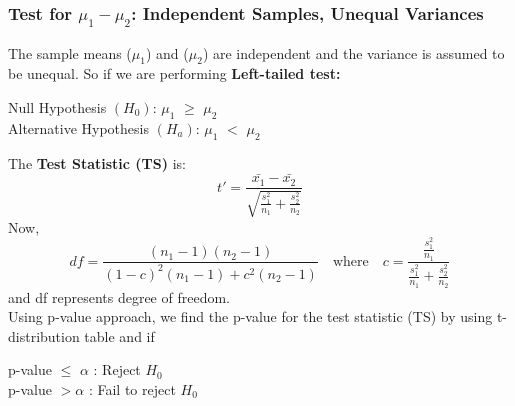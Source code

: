 \documentclass[12pt,a4paper]{report}
\begin{document}
\subsubsection*{\Large{Test for $\mu_1 - \mu_2$: Independent Samples, Unequal Variances}}
The sample means ($\mu_1$) and ($\mu_2$) are independent and the variance is assumed to be unequal. So if we are performing \textbf{Left-tailed test:}

\begin{center}
        Null Hypothesis $(H_0)$: $\mu_1$ $\geq$ $\mu_2$\\
        Alternative Hypothesis $(H_a)$: $\mu_1$ $<$ $\mu_2$ \\
\end{center}
The \textbf{Test Statistic (TS)} is:
    \[t' = \frac{\bar{x_1} - \bar{x_2}}{\sqrt{\frac{s_1^2}{n_1}+\frac{s_2^2}{n_2}}}\]
Now,
\[df = \frac{(n_1 - 1)(n_2 - 1)}{(1-c)^2(n_1 - 1) + c^2(n_2 - 1)} \quad \text{where} \quad c = \frac{\frac{s_1^2}{n_1}}{\frac{s_1^2}{n_1}+\frac{s_2^2}{n_2}}
\]
and df represents degree of freedom. \\

Using p-value approach, we find the p-value for the test statistic (TS) by using t-distribution table and if
\begin{center}
    p-value $\leq$ $\alpha$ : Reject $H_0$ \\
    p-value $ > \alpha$ : Fail to reject $H_0$
\end{center}
     
\end{document}
